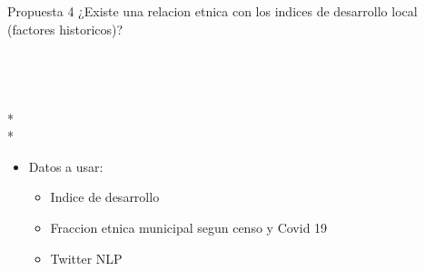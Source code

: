 \documentclass[9pt]{beamer}
\begin{document}
\begin{frame}{Propuesta 4}
¿Existe una relacion etnica con los indices de desarrollo local (factores historicos)?\\~\\
\\~\\
\\*
\\*
\begin{itemize}
\item []

 Datos a usar:
\begin{itemize}
\item Indice de desarrollo
\item Fraccion etnica municipal segun censo y Covid 19 
\item Twitter NLP 
 
 
\end{itemize}
\end{itemize}

\end{frame}
\end{document}
